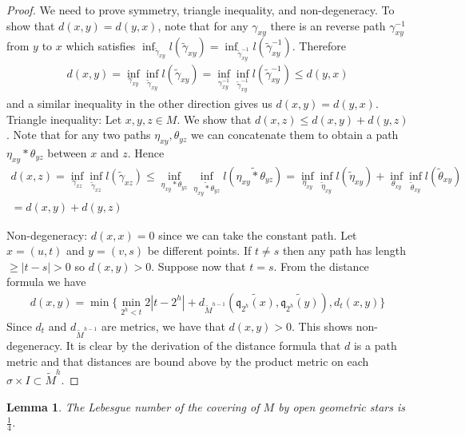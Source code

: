 \documentclass[a4paper,11pt]{article}
\theoremstyle{definition}
\theoremstyle{plain}
\newtheorem{lemma}[definition]{Lemma}
\theoremstyle{remark}
\begin{document}
{\begin{proof} We need to prove symmetry, triangle inequality, and non-degeneracy. To show that $d(x,y)=d(y,x)$, note that for any  $\gamma_{xy}$ there is an reverse path $\gamma^{-1}_{xy}$ from $y$ to $x$ which satisfies $\inf_{\tilde{\gamma}_{xy}} l(\tilde{\gamma}_{xy}) = \inf_{\tilde{\gamma}^{-1}_{xy}} l(\tilde{\gamma}^{-1}_{xy})$. Therefore
\begin{align*}
d(x,y) =  \inf_{\gamma_{xy}} \inf_{\tilde{\gamma}_{xy}}  l(\tilde{\gamma}_{xy}) =  \inf_{\gamma^{-1}_{xy}} \inf_{\tilde{\gamma}^{-1}_{xy}} l(\tilde{\gamma}^{-1}_{xy}) \leq d(y,x)
\end{align*}
and a similar inequality in the other direction gives us $d(x,y) = d(y,x)$.\\

Triangle inequality: Let $x,y,z\in M$. We show that $d(x,z)\leq d(x,y) + d(y,z)$. Note that for any two paths $\eta_{xy}, \theta_{yz}$ we can concatenate them to obtain a path $\eta_{xy}\ast \theta_{yz}$ between $x$ and $z$. Hence
\begin{align*}
d(x,z) = \inf_{\gamma_{xz}} \inf_{\tilde{\gamma}_{xz}} l(\tilde{\gamma}_{xz}) \leq \inf_{\eta_{xy}\ast \theta_{yz}} \inf_{\widetilde{\eta_{xy}\ast \theta_{yz}}} l(\widetilde{\eta_{xy}\ast \theta_{yz}}) = \inf_{\eta_{xy}} \inf_{\tilde{\eta}_{xy}} l(\tilde{\eta}_{xy}) + \inf_{\theta_{xy}} \inf_{\tilde{\theta}_{xy}} l(\tilde{\theta}_{xy}) \\
= d(x,y) + d(y,z)
\end{align*}

Non-degeneracy: $d(x,x)=0$ since we can take the constant path. Let $x = (u,t)$ and $y=(v,s)$ be different points. If $t\neq s$ then any path has length $\geq |t-s|>0$ so $d(x,y)>0$. Suppose now that $t=s$. From the distance formula we have
\begin{align*}
d(x,y) = \min \{\min_{2^h<t} 2|t-2^h| + d_{\tilde{M}^{h-1}}(\widetilde{\mathfrak{q}_{2^h}(x)}, \widetilde{\mathfrak{q}_{2^h}(y)}), d_{t}(x, y)\}
\end{align*}
Since $d_t$ and $d_{\tilde{M}^{h-1}}$ are metrics, we have that $d(x,y)>0$. This shows non-degeneracy. It is clear by the derivation of the distance formula that $d$ is a path metric and that distances are bound above by the product metric on each $\sigma \times I \subset \tilde{M}^{h}$. 
\end{proof}

\begin{lemma} \label{Lebmetric} The Lebesgue number of the covering of $M$ by open geometric stars is $\frac{1}{4}$. 
\end{lemma}

}
\end{document}
